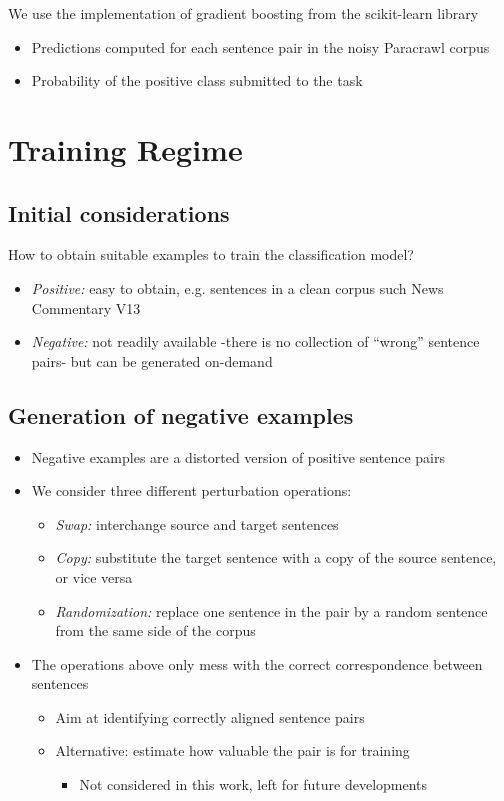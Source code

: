 \documentclass[a0]{sciposter}
\begin{document}
\begin{multicols*}{2}
We use the implementation of gradient boosting from the scikit-learn library %
\begin{itemize}
  \item Predictions computed for each sentence pair in the noisy Paracrawl corpus
  \item Probability of the positive class submitted to the task
\end{itemize}


\section*{\Large Training Regime}
\subsection*{Initial considerations} 
How to obtain suitable examples to train the classification model?
\begin{itemize}
  \item \textit{Positive:} easy to obtain, e.g. sentences in a clean corpus such News Commentary V13
  \item \textit{Negative:} not readily available -there is no collection of ``wrong'' sentence pairs- but can be generated on-demand
\end{itemize}

\subsection*{Generation of negative examples}
\begin{itemize}
  \item Negative examples are a distorted version of positive sentence pairs~\cite{Hainan17}
  \item We consider three different perturbation operations:
  \begin{itemize}
  \item \textit{Swap:} interchange source and target sentences
  \item \textit{Copy:} substitute the target sentence with a copy of the source sentence, or vice versa
  \item \textit{Randomization:} replace one sentence in the pair by a random sentence from the same side of the corpus
  \end{itemize}
  \item The operations above only mess with the correct correspondence between sentences
  \begin{itemize}
    \item Aim at identifying correctly aligned sentence pairs
    \item Alternative: estimate how valuable the pair is for training
    \begin{itemize}
      \item Not considered in this work, left for future developments
    \end{itemize}
  \end{itemize}
\end{itemize}


\end{multicols*}
\end{document}
